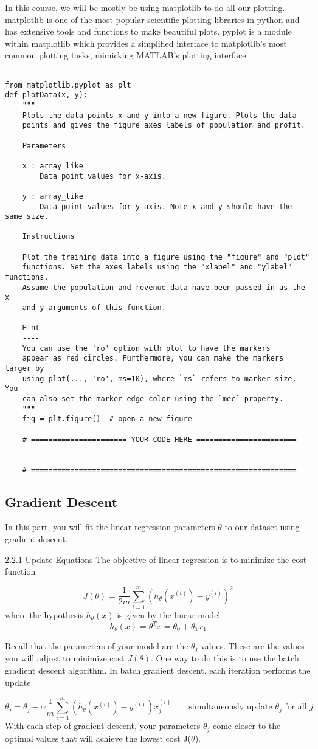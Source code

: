 \documentclass[11pt]{article}
\begin{document}
In this course, we will be mostly be using matplotlib to do all our plotting. matplotlib is one of the most popular scientific plotting libraries in python and has extensive tools and functions to make beautiful plots. pyplot is a module within matplotlib which provides a simplified interface to matplotlib's most common plotting tasks, mimicking MATLAB's plotting interface.
\begin{verbatim}

from matplotlib.pyplot as plt
def plotData(x, y):
    """
    Plots the data points x and y into a new figure. Plots the data
    points and gives the figure axes labels of population and profit.

    Parameters
    ----------
    x : array_like
        Data point values for x-axis.

    y : array_like
        Data point values for y-axis. Note x and y should have the same size.

    Instructions
    ------------
    Plot the training data into a figure using the "figure" and "plot"
    functions. Set the axes labels using the "xlabel" and "ylabel" functions.
    Assume the population and revenue data have been passed in as the x
    and y arguments of this function.

    Hint
    ----
    You can use the 'ro' option with plot to have the markers
    appear as red circles. Furthermore, you can make the markers larger by
    using plot(..., 'ro', ms=10), where `ms` refers to marker size. You
    can also set the marker edge color using the `mec` property.
    """
    fig = plt.figure()  # open a new figure

    # ====================== YOUR CODE HERE =======================


    # =============================================================
\end{verbatim}
\subsection{Gradient Descent}
\label{sec:orgf9068ff}
In this part, you will fit the linear regression parameters \(\theta\) to our dataset using gradient descent.

2.2.1 Update Equations
The objective of linear regression is to minimize the cost function

$$ J(\theta) = \frac{1}{2m} \sum_{i=1}^m \left( h_{\theta}(x^{(i)}) - y^{(i)}\right)^2$$
where the hypothesis \(h_\theta(x)\) is given by the linear model$$ h_\theta(x) = \theta^Tx = \theta_0 + \theta_1 x_1$$

Recall that the parameters of your model are the \(\theta_j\) values. These are the values you will adjust to minimize cost \(J(\theta)\). One way to do this is to use the batch gradient descent algorithm. In batch gradient descent, each iteration performs the update

$$ \theta_j = \theta_j - \alpha \frac{1}{m} \sum_{i=1}^m \left( h_\theta(x^{(i)}) - y^{(i)}\right)x_j^{(i)} \qquad \text{simultaneously update } \theta_j \text{ for all } j$$
With each step of gradient descent, your parameters \(\theta_j\) come closer to the optimal values that will achieve the lowest cost J(\(\theta\)).
\end{document}
